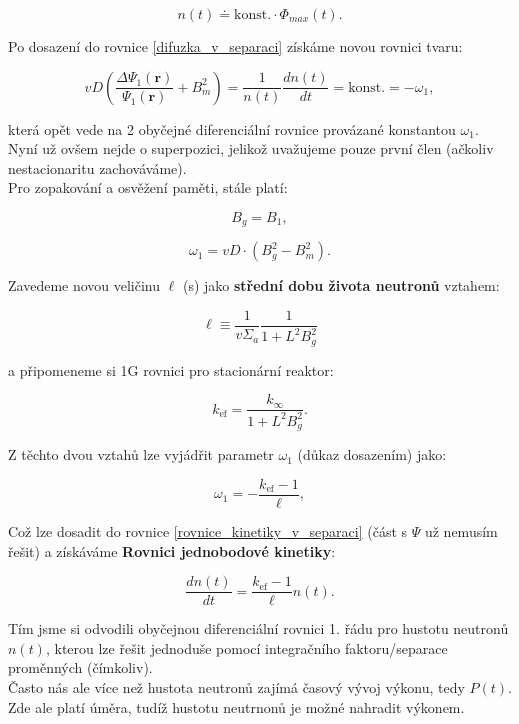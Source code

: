 $$ n(t) \doteq \text{konst.} \cdot \Phi_{max} (t). $$

Po dosazení do rovnice \eqref{difuzka_v_separaci} získáme novou rovnici tvaru:

\begin{equation}
  v D \left ( \dfrac{\Delta \Psi_1 (\textbf{r})}{\Psi_1 (\textbf{r})} + B_m^2 \right ) = \dfrac{1}{n(t)} \dfrac{d n(t)}{d t} = \text{konst.} = - \omega_1,
  \label{rovnice_kinetiky_v_separaci}
\end{equation}

která opět vede na 2 obyčejné diferenciální rovnice provázané konstantou $\omega_1$. Nyní už ovšem nejde o superpozici, jelikož uvažujeme pouze první člen (ačkoliv nestacionaritu zachováváme).\\

Pro zopakování a osvěžení paměti, stále platí:

$$ B_g = B_1, $$

$$ \omega_1 = vD \cdot (B_g^2 - B_m^2). $$

Zavedeme novou veličinu $\ell$ (s) jako \textbf{střední dobu života neutronů} vztahem:

\begin{equation}
  \boxed{
  \ell \equiv \dfrac{1}{v \Sigma_a} \dfrac{1}{1+L^2B_g^2}
  \label{stredni_doba_zivota}}
\end{equation}

a připomeneme si 1G rovnici pro stacionární reaktor:

$$ k_{\text{ef}} = \dfrac{k_{\infty}}{1 + L^2 B_g^2}. $$

Z těchto dvou vztahů lze vyjádřit parametr $\omega_1$ (důkaz dosazením) jako:

$$ \omega_1 = -\dfrac{k_{\text{ef}} - 1}{\ell}, $$

Což lze dosadit do rovnice \eqref{rovnice_kinetiky_v_separaci} (část s $\Psi$ už nemusím řešit) a získáváme \textbf{Rovnici jednobodové kinetiky}:

\begin{equation}
  \boxed{
  \dfrac{dn(t)}{dt} = \dfrac{k_{\text{ef}} - 1}{\ell} n(t).
  \label{rovnice_kinetiky_reseni}}
\end{equation}

Tím jsme si odvodili obyčejnou diferenciální rovnici 1. řádu pro hustotu neutronů $n(t)$, kterou lze řešit jednoduše pomocí integračního faktoru/separace proměnných (čímkoliv).\\

Často nás ale více než hustota neutronů zajímá časový vývoj výkonu, tedy $P(t)$. Zde ale platí úměra, tudíž hustotu neutrnonů je možné nahradit výkonem.\\

